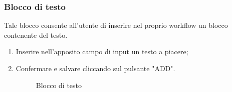\subsubsection{Blocco di testo}
Tale blocco consente all'utente di inserire nel proprio workflow un blocco contenente del testo.
\begin{enumerate}
	\item Inserire nell'apposito campo di input un testo a piacere;
	\item Confermare e salvare cliccando sul pulsante "ADD".
	\begin{figure}[!ht]
		\centering
		\caption{Blocco di testo}
	\end{figure}
\end{enumerate}

